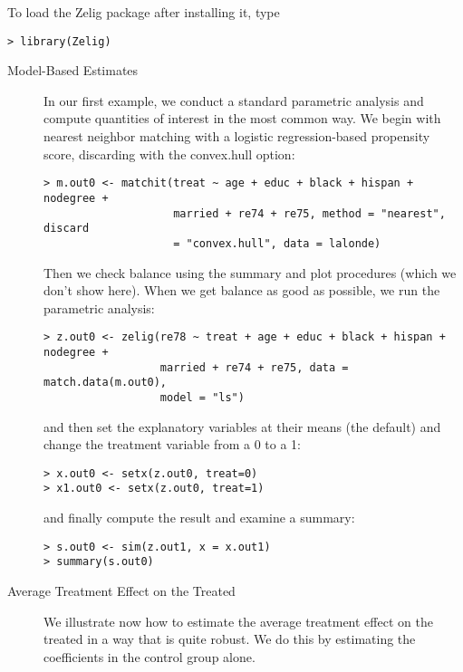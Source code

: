 To load the Zelig package after installing it, type
\begin{verbatim}
> library(Zelig)
\end{verbatim}

\begin{description}
\item[Model-Based Estimates] In our first example, we conduct a
  standard parametric analysis and compute quantities of interest in
  the most common way.  We begin with nearest neighbor matching with a
  logistic regression-based propensity score, discarding with the
  convex.hull option:
\begin{verbatim}
> m.out0 <- matchit(treat ~ age + educ + black + hispan + nodegree + 
                    married + re74 + re75, method = "nearest", discard
                    = "convex.hull", data = lalonde)
\end{verbatim}
  Then we check balance using the summary and plot procedures (which
  we don't show here).  When we get balance as good as possible, we
  run the parametric analysis:
\begin{verbatim}
> z.out0 <- zelig(re78 ~ treat + age + educ + black + hispan + nodegree + 
                  married + re74 + re75, data = match.data(m.out0), 
                  model = "ls")
\end{verbatim}
  and then set the explanatory variables at their means (the default)
  and change the treatment variable from a 0 to a 1:
\begin{verbatim}
> x.out0 <- setx(z.out0, treat=0)
> x1.out0 <- setx(z.out0, treat=1)
\end{verbatim}
and finally compute the result and examine a summary:
\begin{verbatim}
> s.out0 <- sim(z.out1, x = x.out1)
> summary(s.out0)
\end{verbatim}

\item[Average Treatment Effect on the Treated] We illustrate now how
  to estimate the average treatment effect on the treated in a way
  that is quite robust.  We do this by estimating the coefficients in
  the control group alone.


\end{description}
